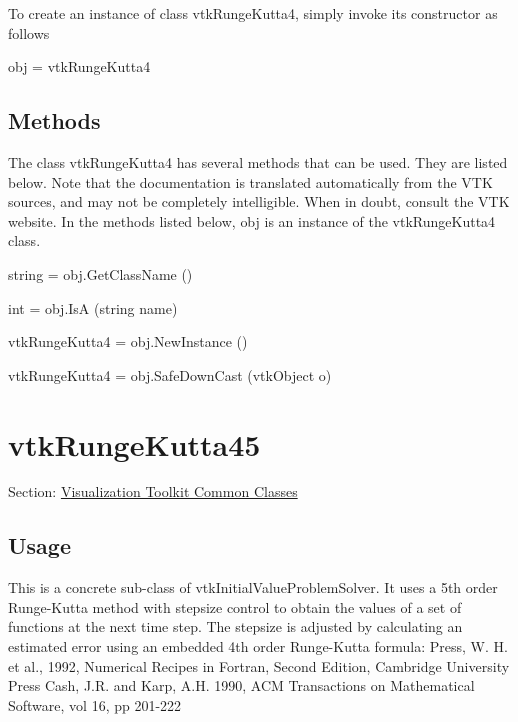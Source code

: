 To create an instance of class vtk\-Runge\-Kutta4, simply invoke its constructor as follows \begin{DoxyVerb}  obj = vtkRungeKutta4
\end{DoxyVerb}
 \hypertarget{vtkwidgets_vtkxyplotwidget_Methods}{}\subsection{Methods}\label{vtkwidgets_vtkxyplotwidget_Methods}
The class vtk\-Runge\-Kutta4 has several methods that can be used. They are listed below. Note that the documentation is translated automatically from the V\-T\-K sources, and may not be completely intelligible. When in doubt, consult the V\-T\-K website. In the methods listed below, {\ttfamily obj} is an instance of the vtk\-Runge\-Kutta4 class. 
\begin{DoxyItemize}
\item {\ttfamily string = obj.\-Get\-Class\-Name ()}  
\item {\ttfamily int = obj.\-Is\-A (string name)}  
\item {\ttfamily vtk\-Runge\-Kutta4 = obj.\-New\-Instance ()}  
\item {\ttfamily vtk\-Runge\-Kutta4 = obj.\-Safe\-Down\-Cast (vtk\-Object o)}  
\end{DoxyItemize}\hypertarget{vtkcommon_vtkrungekutta45}{}\section{vtk\-Runge\-Kutta45}\label{vtkcommon_vtkrungekutta45}
Section\-: \hyperlink{sec_vtkcommon}{Visualization Toolkit Common Classes} \hypertarget{vtkwidgets_vtkxyplotwidget_Usage}{}\subsection{Usage}\label{vtkwidgets_vtkxyplotwidget_Usage}
This is a concrete sub-\/class of vtk\-Initial\-Value\-Problem\-Solver. It uses a 5th order Runge-\/\-Kutta method with stepsize control to obtain the values of a set of functions at the next time step. The stepsize is adjusted by calculating an estimated error using an embedded 4th order Runge-\/\-Kutta formula\-: Press, W. H. et al., 1992, Numerical Recipes in Fortran, Second Edition, Cambridge University Press Cash, J.\-R. and Karp, A.\-H. 1990, A\-C\-M Transactions on Mathematical Software, vol 16, pp 201-\/222

